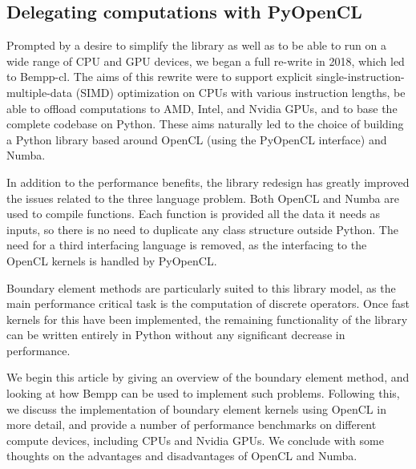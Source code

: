 \subsection{Delegating computations with PyOpenCL}
Prompted by a desire to simplify the library as well as to be able to run on a wide range of CPU and GPU devices, we began a full re-write in 2018, which led to Bempp-cl. The aims of this rewrite were to support explicit single-instruction-multiple-data (SIMD) optimization on CPUs with various instruction lengths, be able to offload computations to AMD, Intel, and Nvidia GPUs, and to base the complete codebase on Python. These aims naturally led to the choice of building a Python library based around OpenCL (using the PyOpenCL interface) and Numba.

In addition to the performance benefits, the library redesign has greatly improved the issues related to the three language problem. Both OpenCL and Numba are used to compile functions. Each function is provided all the data it needs as inputs, so there is no need to duplicate any class structure outside Python. The need for a third interfacing language is removed, as the interfacing to the OpenCL kernels is handled by PyOpenCL.

Boundary element methods are particularly suited to this library model, as the main performance critical task is the computation of discrete operators. Once fast kernels for this have been implemented, the remaining functionality of the library can be written entirely in Python without any significant decrease in performance.

\bigskip

We begin this article by giving an overview of the boundary element method, and looking at how Bempp can be used to implement such problems. Following this, we discuss the implementation of boundary element kernels using OpenCL in more detail, and provide a number of performance benchmarks on different compute devices, including CPUs and Nvidia GPUs. We conclude with some thoughts on the advantages and disadvantages of OpenCL and Numba.

